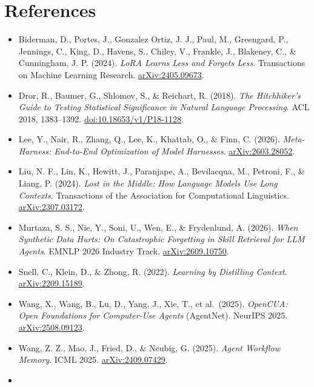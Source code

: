 \documentclass[
  10pt,
]{article}
\providecommand{\tightlist}{%
  \setlength{\itemsep}{0pt}\setlength{\parskip}{0pt}}
\begin{document}
\small

\section{References}\label{references}

\begin{itemize}
\tightlist
\item
  Biderman, D., Portes, J., Gonzalez Ortiz, J. J., Paul, M., Greengard,
  P., Jennings, C., King, D., Havens, S., Chiley, V., Frankle, J.,
  Blakeney, C., \& Cunningham, J. P. (2024). \emph{LoRA Learns Less and
  Forgets Less}. Transactions on Machine Learning Research.
  \href{https://arxiv.org/abs/2405.09673}{arXiv:2405.09673}.
\item
  Dror, R., Baumer, G., Shlomov, S., \& Reichart, R. (2018). \emph{The
  Hitchhiker's Guide to Testing Statistical Significance in Natural
  Language Processing}. ACL 2018, 1383--1392.
  \href{https://aclanthology.org/P18-1128/}{doi:10.18653/v1/P18-1128}.
\item
  Lee, Y., Nair, R., Zhang, Q., Lee, K., Khattab, O., \& Finn, C.
  (2026). \emph{Meta-Harness: End-to-End Optimization of Model
  Harnesses}. \href{https://arxiv.org/abs/2603.28052}{arXiv:2603.28052}.
\item
  Liu, N. F., Lin, K., Hewitt, J., Paranjape, A., Bevilacqua, M.,
  Petroni, F., \& Liang, P. (2024). \emph{Lost in the Middle: How
  Language Models Use Long Contexts}. Transactions of the Association
  for Computational Linguistics.
  \href{https://arxiv.org/abs/2307.03172}{arXiv:2307.03172}.
\item
  Murtaza, S. S., Nie, Y., Soni, U., Wen, E., \& Frydenlund, A. (2026).
  \emph{When Synthetic Data Hurts: On Catastrophic Forgetting in Skill
  Retrieval for LLM Agents}. EMNLP 2026 Industry Track.
  \href{https://arxiv.org/abs/2609.10750}{arXiv:2609.10750}.
\item
  Snell, C., Klein, D., \& Zhong, R. (2022). \emph{Learning by
  Distilling Context}.
  \href{https://arxiv.org/abs/2209.15189}{arXiv:2209.15189}.
\item
  Wang, X., Wang, B., Lu, D., Yang, J., Xie, T., et al.~(2025).
  \emph{OpenCUA: Open Foundations for Computer-Use Agents} (AgentNet).
  NeurIPS 2025.
  \href{https://arxiv.org/abs/2508.09123}{arXiv:2508.09123}.
\item
  Wang, Z. Z., Mao, J., Fried, D., \& Neubig, G. (2025). \emph{Agent
  Workflow Memory}. ICML 2025.
  \href{https://arxiv.org/abs/2409.07429}{arXiv:2409.07429}.
\item

\end{itemize}
\end{document}
